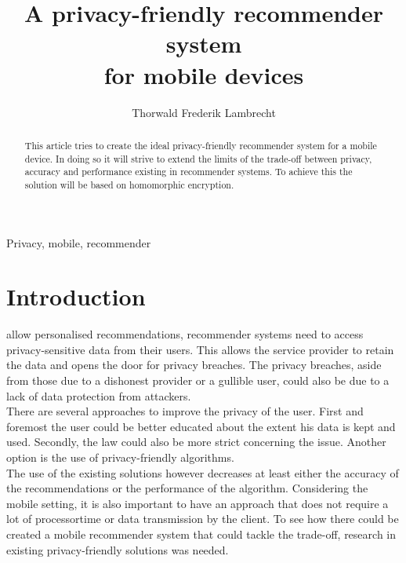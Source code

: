 \documentclass[twocolumn]{phdsymp} %
\begin{document}
\title{A privacy-friendly recommender system\\ for mobile devices} %

\author{Thorwald Frederik Lambrecht}


\maketitle

\begin{abstract}
This article tries to create the ideal privacy-friendly recommender system for a mobile device. In doing so it will strive to extend the limits of the trade-off between privacy, accuracy and performance existing in recommender systems. To achieve this the solution will be based on  homomorphic encryption.
\end{abstract}

\begin{keywords}
Privacy, mobile, recommender
\end{keywords}

\section{Introduction}
 allow personalised recommendations, recommender systems need to access privacy-sensitive data from their users. This allows the service provider to retain the data and opens the door for privacy breaches. The privacy breaches, aside from those due to a dishonest provider or a gullible user, could also be due to a lack of data protection from attackers.\\ There are several approaches to improve the privacy of the user. First and foremost the user could be better educated about the extent his data is kept and used. Secondly, the law could also be more strict concerning the issue. Another option is the use of privacy-friendly algorithms. \\
The use of the existing solutions however decreases at least either the accuracy of the recommendations or the performance of the algorithm. Considering the mobile setting, it is also important to have an approach that does not require a lot of processortime or data transmission by the client. To see how there could be created a mobile recommender system that could tackle the trade-off, research in existing privacy-friendly solutions was needed. 
\end{document}
